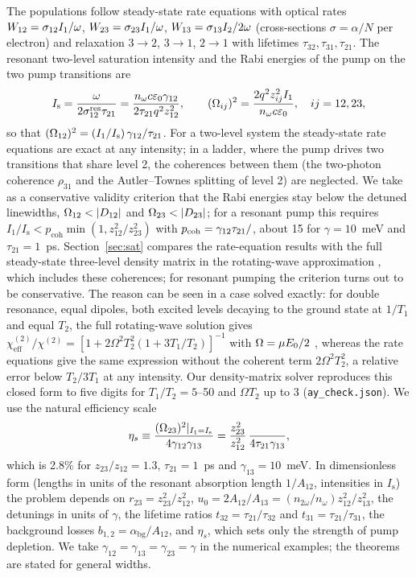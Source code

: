 \documentclass[11pt]{article}
\newcommand{\chitwo}{\chi^{(2)}}
\newcommand{\Is}{I_\mathrm{s}}
\let\hbar\relax\DeclareRobustCommand{\hbar}{{\mathchar'26\mkern-9mu h}}
\begin{document}
The populations follow steady-state rate equations with optical rates $W_{12}=\sigma_{12}I_1/\hbar\omega$, $W_{23}=\sigma_{23}I_1/\hbar\omega$, $W_{13}=\sigma_{13}I_2/2\hbar\omega$ (cross-sections $\sigma=\alpha/N$ per electron) and relaxation $3\to2$, $3\to1$, $2\to1$ with lifetimes $\tau_{32},\tau_{31},\tau_{21}$. The resonant two-level saturation intensity and the Rabi energies of the pump on the two pump transitions are
\begin{equation}
\Is=\frac{\hbar\omega}{2\sigma_{12}^\mathrm{res}\tau_{21}}=\frac{\hbar n_\omega c\varepsilon_0\gamma_{12}}{2\tau_{21}q^2z_{12}^2},\qquad
(\hbar\Omega_{ij})^2=\frac{2q^2z_{ij}^2I_1}{n_\omega c\varepsilon_0},\quad ij=12,23,\label{eq:Is}
\end{equation}
so that $(\hbar\Omega_{12})^2=(I_1/\Is)\,\hbar\gamma_{12}/\tau_{21}$. For a two-level system the steady-state rate equations are exact at any intensity; in a ladder, where the pump drives two transitions that share level 2, the coherences between them (the two-photon coherence $\rho_{31}$ and the Autler--Townes splitting of level 2) are neglected. We take as a conservative validity criterion that the Rabi energies stay below the detuned linewidths, $\hbar\Omega_{12}<|D_{12}|$ and $\hbar\Omega_{23}<|D_{23}|$; for a resonant pump this requires $I_1/\Is<p_\mathrm{coh}\min(1,z_{12}^2/z_{23}^2)$ with $p_\mathrm{coh}=\gamma_{12}\tau_{21}/\hbar$, about 15 for $\gamma=10$~meV and $\tau_{21}=1$~ps. Section~\ref{sec:sat} compares the rate-equation results with the full steady-state three-level density matrix in the rotating-wave approximation \cite{Allen1975}, which includes these coherences; for resonant pumping the criterion turns out to be conservative. The reason can be seen in a case solved exactly: for double resonance, equal dipoles, both excited levels decaying to the ground state at $1/T_1$ and equal $T_2$, the full rotating-wave solution gives $\chitwo_\mathrm{eff}/\chitwo=[1+2\Omega^2T_2^2(1+3T_1/T_2)]^{-1}$ with $\Omega=\mu E_0/2\hbar$ \cite{AlmogyLEOS1994}, whereas the rate equations give the same expression without the coherent term $2\Omega^2T_2^2$, a relative error below $T_2/3T_1$ at any intensity. Our density-matrix solver reproduces this closed form to five digits for $T_1/T_2=5$--50 and $\Omega T_2$ up to 3 (\texttt{ay\_check.json}). We use the natural efficiency scale
\begin{equation}
\eta_s\equiv\frac{(\hbar\Omega_{23})^2|_{I_1=\Is}}{4\gamma_{12}\gamma_{13}}=\frac{z_{23}^2}{z_{12}^2}\,\frac{\hbar}{4\tau_{21}\gamma_{13}},\label{eq:etas}
\end{equation}
which is 2.8\% for $z_{23}/z_{12}=1.3$, $\tau_{21}=1$~ps and $\gamma_{13}=10$~meV. In dimensionless form (lengths in units of the resonant absorption length $1/A_{12}$, intensities in $\Is$) the problem depends on $r_{23}=z_{23}^2/z_{12}^2$, $u_0=2A_{12}/A_{13}=(n_{2\omega}/n_\omega)z_{12}^2/z_{13}^2$, the detunings in units of $\gamma$, the lifetime ratios $t_{32}=\tau_{21}/\tau_{32}$ and $t_{31}=\tau_{21}/\tau_{31}$, the background losses $b_{1,2}=\alpha_\mathrm{bg}/A_{12}$, and $\eta_s$, which sets only the strength of pump depletion. We take $\gamma_{12}=\gamma_{13}=\gamma_{23}=\gamma$ in the numerical examples; the theorems are stated for general widths.
\end{document}
